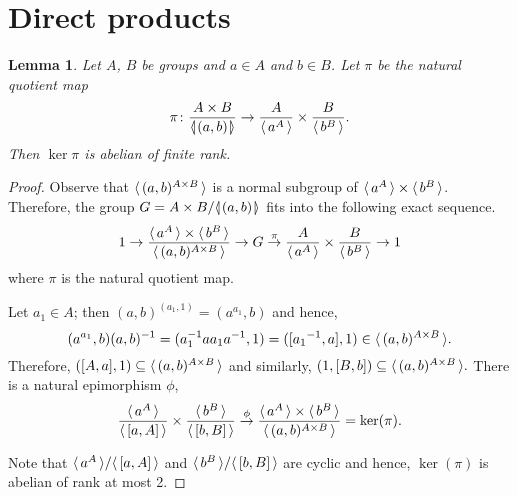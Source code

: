 \documentclass[12pt, a4paper]{amsart}
\newtheorem{Lem}[Thm]{Lemma}
\theoremstyle{remark}
\theoremstyle{definition}
\begin{document}
\section{Direct products} \label{sec:DP}

\begin{Lem}\label{Lem:exten}
Let $A$, $B$ be groups and $a\in A$ and $b\in B$. Let $\pi$ be the natural quotient map $$\pi\colon \dfrac{A\times B}{{{\langle}{\mkern-3.7mu}{\lvert}{\mkern1.2mu}{{(a,b)}}{\mkern1.2mu}{\rvert}{\mkern-3.7mu}{\rangle}}}\to \frac{A}{{\langle\mkern3mu{a^A}\mkern3mu\rangle}} \times \frac{B}{{\langle\mkern3mu{b^B}\mkern3mu\rangle}}.$$
Then $\ker{\pi}$ is abelian of finite rank.
\end{Lem}
\begin{proof}

Observe that ${\langle\mkern3mu{(a,b)^{A\times B}}\mkern3mu\rangle}$ is a normal subgroup of ${\langle\mkern3mu{a^A}\mkern3mu\rangle}\times{\langle\mkern3mu{b^B}\mkern3mu\rangle}$.  Therefore, the group $G=A\times B/{{\langle}{\mkern-3.7mu}{\lvert}{\mkern1.2mu}{{(a,b)}}{\mkern1.2mu}{\rvert}{\mkern-3.7mu}{\rangle}}$ fits into the following exact sequence.
\begin{equation}\label{eq:extWP}1 \rightarrow \frac{{\langle\mkern3mu{a^A}\mkern3mu\rangle} \times {\langle\mkern3mu{b^B}\mkern3mu\rangle}}{{\langle\mkern3mu{(a,b)^{A\times B}}\mkern3mu\rangle}} \rightarrow G \stackrel{\pi}{\rightarrow} \frac{A}{{\langle\mkern3mu{a^A}\mkern3mu\rangle}} \times \frac{B}{{\langle\mkern3mu{b^B}\mkern3mu\rangle}} \rightarrow 1\end{equation}
where $\pi$ is the natural quotient map.

Let $a_1\in A$; then $(a,b)^{(a_1,1)}=(a^{a_1},b)$ and hence,  
$$(a^{a_1},b)(a,b)^{-1}=(a_1^{-1}aa_1a^{-1},1)=([{a_1}^{-1},a],1)\in {\langle\mkern3mu{(a,b)^{A\times B}}\mkern3mu\rangle}.$$
Therefore, $([A,a],1)\subseteq {\langle\mkern3mu{(a,b)^{A\times B}}\mkern3mu\rangle}$  and similarly, $(1,[B,b])\subseteq {\langle\mkern3mu{(a,b)^{A\times B}}\mkern3mu\rangle}.$ There is a natural epimorphism $\phi$,  $$\frac{{\langle\mkern3mu{a^A}\mkern3mu\rangle}}{{\langle\mkern3mu{[a,A]}\mkern3mu\rangle}}\times\frac{{\langle\mkern3mu{b^B}\mkern3mu\rangle}}{{\langle\mkern3mu{[b,B]}\mkern3mu\rangle}}\stackrel{\phi}{\to} \frac{{\langle\mkern3mu{a^A}\mkern3mu\rangle} \times {\langle\mkern3mu{b^B}\mkern3mu\rangle}}{{\langle\mkern3mu{(a,b)^{A\times B}}\mkern3mu\rangle}} =\ker (\pi).$$ 

Note that ${\langle\mkern3mu{a^A}\mkern3mu\rangle}/{\langle\mkern3mu{[a,A]}\mkern3mu\rangle}$ and ${\langle\mkern3mu{b^B}\mkern3mu\rangle}/{\langle\mkern3mu{[b,B]}\mkern3mu\rangle}$ are cyclic and hence, $\ker (\pi)$ is abelian of  rank at most 2. 

\end{proof}
\end{document}
